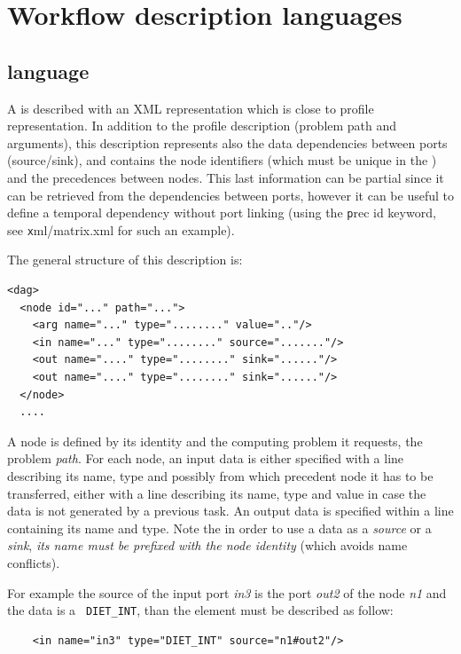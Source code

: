 \section{Workflow description languages}

\subsection{\madag language}
\label{sec:dag_desc}

A \DAG is described with an XML representation which is close to \diet profile
representation. In addition to the profile description (problem path and
arguments), this description represents also the data dependencies between
ports (source/sink), and contains the node identifiers (which must be unique in
the \DAG) and the precedences between nodes. This last information can be
partial since it can be retrieved from the dependencies between ports, however
it can be useful to define a temporal dependency without port linking (using
the {\texttt prec id} keyword, see {\texttt xml/matrix.xml} for such an
example).

The general structure of this description is:

\begin{verbatim}
<dag>
  <node id="..." path="...">
    <arg name="..." type="........" value=".."/>
    <in name="..." type="........" source="......."/>
    <out name="...." type="........" sink="......"/>
    <out name="...." type="........" sink="......"/>
  </node>
  ....
\end{verbatim}

A node is defined by its identity and the computing problem it requests, \ie
the problem {\it path}. For each node, an input data is either specified with a
line describing its name, type and possibly from which precedent node it has to
be transferred, either with a line describing its name, type and value in case
the data is not generated by a previous task. An output data is specified
within a line containing its name and type. Note the in order to use a data as
a \textit{source} or a \textit{sink}, {\it its name must be prefixed with the
  node identity} (which avoids name conflicts). 

For example the source of the input port \textit{in3} is the port \textit{out2}
of the node \textit{n1} and the data is a \verb! DIET_INT!, than the element
must be described as follow:

\begin{verbatim}
    <in name="in3" type="DIET_INT" source="n1#out2"/>
\end{verbatim}

